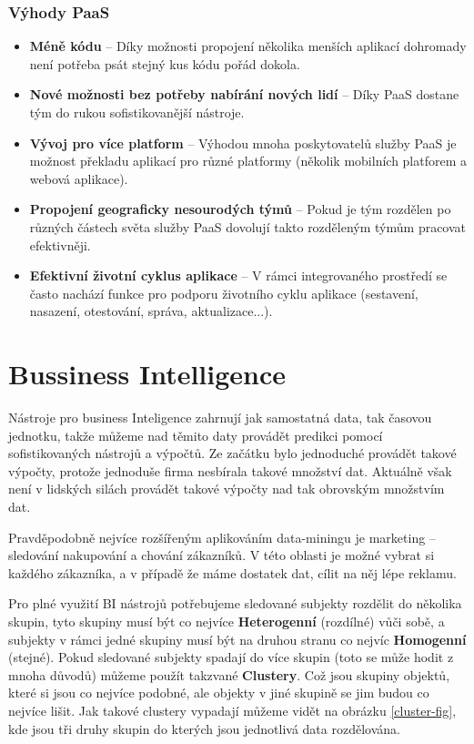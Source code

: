 \subsubsection{Výhody PaaS}
\begin{itemize}
\item \textbf{Méně kódu} -- Díky možnosti propojení několika menších aplikací dohromady není potřeba psát stejný kus kódu pořád dokola.
\item \textbf{Nové možnosti bez potřeby nabírání nových lidí} -- Díky PaaS dostane tým do rukou sofistikovanější nástroje.
\item \textbf{Vývoj pro více platform} -- Výhodou mnoha poskytovatelů služby PaaS je možnost překladu aplikací pro různé platformy (několik mobilních platforem a webová aplikace).
\item \textbf{Propojení geograficky nesourodých týmů} -- Pokud je tým rozdělen po různých částech světa služby PaaS dovolují takto rozděleným týmům pracovat efektivněji.
\item \textbf{Efektivní životní cyklus aplikace} -- V rámci integrovaného prostředí se často nachází funkce pro podporu životního cyklu aplikace (sestavení, nasazení, otestování, správa, aktualizace...). \cite{co-je-paas}
\end{itemize}

\section{Bussiness Intelligence}
\par Nástroje pro business Inteligence zahrnují jak samostatná data, tak časovou jednotku, takže můžeme nad těmito daty provádět predikci pomocí sofistikovaných nástrojů a výpočtů. Ze začátku bylo jednoduché provádět takové výpočty, protože jednoduše firma nesbírala takové množství dat. Aktuálně však není v lidských silách provádět takové výpočty nad tak obrovským množstvím dat. \cite{data-science-business}

\par Pravděpodobně nejvíce rozšířeným aplikováním data-miningu je marketing -- sledování nakupování a chování zákazníků. V této oblasti je možné vybrat si každého zákazníka, a v případě že máme dostatek dat, cílit na něj lépe reklamu. \cite{data-science-business}

\par Pro plné využití BI nástrojů potřebujeme sledované subjekty rozdělit do několika skupin, tyto skupiny musí být co nejvíce \textbf{Heterogenní} (rozdílné) vůči sobě, a subjekty v rámci jedné skupiny musí být na druhou stranu co nejvíc \textbf{Homogenní} (stejné). Pokud sledované subjekty spadají do více skupin (toto se může hodit z mnoha důvodů) můžeme použít takzvané \textbf{Clustery}. Což jsou skupiny objektů, které si jsou co nejvíce podobné, ale objekty v jiné skupině se jim budou co nejvíce lišit. \cite{data-science-business} Jak takové clustery vypadají můžeme vidět na obrázku \ref{cluster-fig}, kde jsou tři druhy skupin do kterých jsou jednotlivá data rozdělována.

